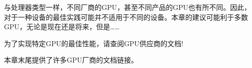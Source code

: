 与处理器类型一样，不同厂商的GPU，甚至不同产品的GPU也有所不同。因此，对于一种设备的最佳实践可能并不适用于不同的设备。本章的建议可能利于多数GPU，无论是现在还是将来，但是……\par

\begin{tcolorbox}[colback=red!5!white,colframe=red!75!black]
为了实现特定GPU的最佳性能，请查阅GPU供应商的文档!
\end{tcolorbox}

本章末尾提供了许多GPU厂商的文档链接。\par






















































